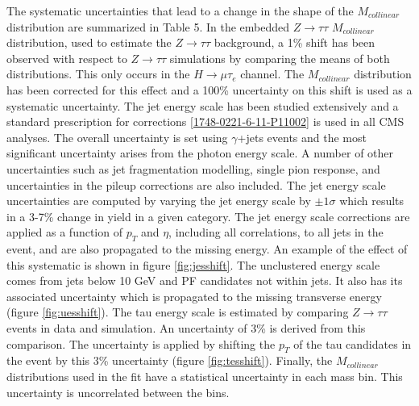 \documentclass[oneside, letterpaper, oldfontcommands]{memoir}
\begin{document}
\qquad The systematic uncertainties that lead to a change in the shape of the $M_{collinear}$ distribution are summarized in Table 5. In the embedded $Z \rightarrow \tau\tau$ $M_{collinear}$ distribution, used to estimate the $Z \rightarrow \tau\tau$ background, a 1\% shift has been observed with respect to $Z \rightarrow \tau\tau$ simulations by comparing the means of both distributions. This only occurs in the $H \rightarrow \mu\tau_{e}$ channel. The $M_{collinear}$ distribution has been corrected for this effect and a 100\% uncertainty on this shift is used as a systematic uncertainty. The jet energy scale has been studied extensively and a standard prescription for corrections \ref{1748-0221-6-11-P11002} is used in all CMS analyses. The overall uncertainty is set using $\gamma$+jets events and the most significant uncertainty arises from the photon energy scale. A number of other uncertainties such as jet fragmentation modelling, single pion response, and uncertainties in the pileup corrections are also included. The jet energy scale uncertainties are computed by varying the jet energy scale by $\pm 1 \sigma$ which results in a 3-7\% change in yield in a given category. The jet energy scale corrections are applied as a function of $p_{T}$ and $\eta$, including all correlations, to all jets in the event, and are also propagated to the missing energy. An example of the effect of this systematic is shown in figure \ref{fig:jesshift}. The unclustered energy scale comes from jets below 10 GeV and PF candidates not within jets. It also has its associated uncertainty which is propagated to the missing transverse energy (figure \ref{fig:uesshift}). The tau energy scale is estimated by comparing $Z \rightarrow \tau\tau$ events in data and simulation. An uncertainty of 3\% is derived from this comparison\cite{CMS-PAS-HIG-12-018}. The uncertainty is applied by shifting the $p_{T}$ of the tau candidates in the event by this 3\% uncertainty (figure \ref{fig:tesshift}). Finally, the $M_{collinear}$ distributions used in the fit have a statistical uncertainty in each mass bin. This uncertainty is uncorrelated between the bins.
\end{document}
